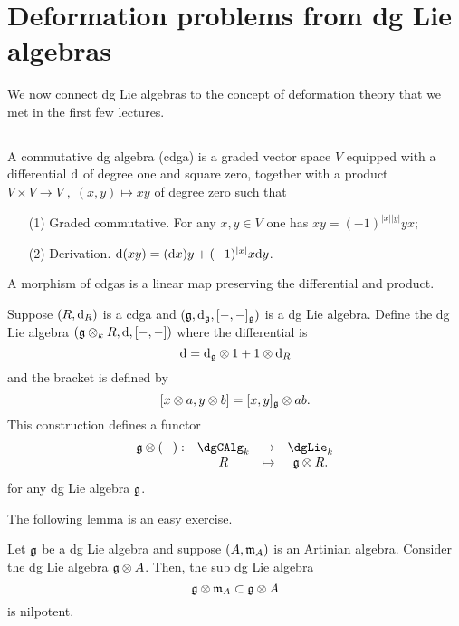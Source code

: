 \documentclass[11pt]{amsart}
\begin{document}
\section{Deformation problems from dg Lie algebras}

We now connect dg Lie algebras to the concept of deformation theory that we met in the first few lectures. 

\subsection{}

\begin{dfn}
A commutative dg algebra (cdga) is a graded vector space $V$ equipped with a differential ${\rm d}$ of degree one and square zero, together with a product $V \times V \to V \;,\; (x,y) \mapsto xy$ of degree zero such that 
\begin{enumerate}
\item[(1)] Graded commutative. 
For any $x,y \in V$ one has $xy = (-1)^{|x||y|} y x$;
\item[(2)] Derivation. ${\rm d} (xy) = ({\rm d} x) y + (-1)^{|x|} x {\rm d} y$.
\end{enumerate}
A morphism of cdgas is a linear map preserving the differential and product. 
\end{dfn}

\begin{dfn} Suppose $(R,{\rm d}_R)$ is a cdga and $(\mathfrak g,{\rm d}_{\mathfrak g}, [-,-]_\mathfrak g)$ is a dg Lie algebra. 
Define the dg Lie algebra $(\mathfrak g \otimes_k R, {\rm d}, [-,-])$ where the differential is 
\[
{\rm d} = {\rm d}_\mathfrak g \otimes 1 + 1 \otimes {\rm d}_{R}
\]
and the bracket is defined by
\[
[x \otimes a, y \otimes b] = [x,y]_\mathfrak g \otimes ab .
\] 
This construction defines a functor
\[
\begin{array}{cccc}
\fg \tensor (-) : & \dgCAlg_k & \to & \dgLie_k \\
& R & \mapsto & \fg \tensor R .
\end{array}
\]
for any dg Lie algebra $\mathfrak g$. 
\end{dfn}

The following lemma is an easy exercise. 

\begin{lem}
Let $\mathfrak g$ be a dg Lie algebra and suppose $(A,{\mathfrak m}_A)$ is an Artinian algebra.
Consider the dg Lie algebra $\mathfrak g \otimes A$. 
Then, the sub dg Lie algebra
\[
\mathfrak g \otimes {\mathfrak m}_A \subset \mathfrak g \otimes A
\]
is nilpotent.
\end{lem}
\end{document}

